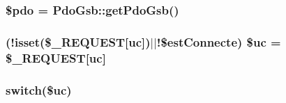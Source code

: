 \subsubsection[{\texorpdfstring{\$pdo}{$pdo}}]{\setlength{\rightskip}{0pt plus 5cm}\$pdo = {\bf Pdo\+Gsb\+::get\+Pdo\+Gsb}()}\hypertarget{index_8php_a5766efd703cef0e00bfc06b3f3acbe0e}{}\label{index_8php_a5766efd703cef0e00bfc06b3f3acbe0e}
\subsubsection[{\texorpdfstring{\$uc}{$uc}}]{ (!isset(\$\+\_\+\+R\+E\+Q\+U\+E\+ST\mbox{[}\textquotesingle{}uc\textquotesingle{}\mbox{]})$\vert$$\vert$!\${\bf est\+Connecte}) \$uc = \$\+\_\+\+R\+E\+Q\+U\+E\+ST\mbox{[}\textquotesingle{}uc\textquotesingle{}\mbox{]}}\hypertarget{index_8php_a85772ca7b85c824f39906410cb9c74e3}{}\label{index_8php_a85772ca7b85c824f39906410cb9c74e3}
\subsubsection[{\texorpdfstring{switch}{switch}}]{\setlength{\rightskip}{0pt plus 5cm}switch(\$uc)}\hypertarget{index_8php_a6160ae6d9a60bbcc19780fa9bc2c9b41}{}\label{index_8php_a6160ae6d9a60bbcc19780fa9bc2c9b41}
